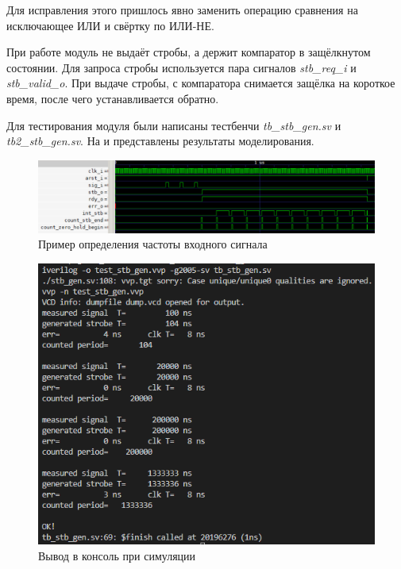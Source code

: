 \FloatBarrier

Для исправления этого пришлось явно заменить операцию сравнения на исключающее ИЛИ и свёртку по ИЛИ-НЕ.

\lstset{
	numbersep = 5pt,
	stepnumber = 1
}

При работе модуль не выдаёт стробы, а держит компаратор в защёлкнутом состоянии. Для запроса стробы используется пара сигналов
\emph{stb\_req\_i} и \emph{stb\_valid\_o}. При выдаче стробы, с компаратора снимается защёлка на короткое время, после чего устанавливается обратно.

Для тестирования модуля были написаны тестбенчи \emph{tb\_stb\_gen.sv} и \emph{tb2\_stb\_gen.sv}. На  и 
представлены результаты моделирования.\\

\FloatBarrier

\begin{figure}[ht!] 
	\center
	\includegraphics  [scale=0.7] {my_folder/images//tb_stb_gen}
	\caption{Пример определения частоты входного сигнала} 
	\label{fig:tb-stb-gen}  
\end{figure}

\begin{figure}[ht!] 
	\center
	\includegraphics  [scale=0.8] {my_folder/images//tb_stb_gen_out}
	\caption{Вывод в консоль при симуляции} 
	\label{fig:tb-stb-gen-out}  
\end{figure}
\FloatBarrier

